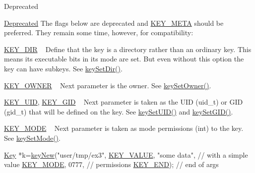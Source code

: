 \begin{DoxyRefDesc}{Deprecated}
\item[\hyperlink{deprecated__deprecated000010}{Deprecated}]The flags below are deprecated and \hyperlink{group__key_gga91fb3178848bd682000958089abbaf40a040582834bb2d90049947d7ef74e87e2}{K\+E\+Y\+\_\+\+M\+E\+TA} should be preferred. They remain some time, however, for compatibility\+:
\begin{DoxyItemize}
\item \hyperlink{group__key_gga91fb3178848bd682000958089abbaf40a9e43e47c8a21478538e2d20e049981d5}{K\+E\+Y\+\_\+\+D\+IR} ~\newline
 Define that the key is a directory rather than an ordinary key. This means its executable bits in its mode are set. But even without this option the key can have subkeys. See \hyperlink{group__meta_gaae575bd86a628a15ee45baa860522e75}{key\+Set\+Dir()}.
\item \hyperlink{group__key_gga91fb3178848bd682000958089abbaf40a77ca60362fa8daca8d5347db4385068b}{K\+E\+Y\+\_\+\+O\+W\+N\+ER} ~\newline
 Next parameter is the owner. See \hyperlink{owner_8c_a88d6ec200ba0707b7c1b4a88133d2be4}{key\+Set\+Owner()}.
\item \hyperlink{group__key_gga91fb3178848bd682000958089abbaf40a28f01a87d65f065172f734c9c9446c0e}{K\+E\+Y\+\_\+\+U\+ID}, \hyperlink{group__key_gga91fb3178848bd682000958089abbaf40ac0628bbaba7c837ca73323681393d15f}{K\+E\+Y\+\_\+\+G\+ID} ~\newline
 Next parameter is taken as the U\+ID (uid\+\_\+t) or G\+ID (gid\+\_\+t) that will be defined on the key. See \hyperlink{group__meta_gab5f284f5ecd261e0a290095f50ba1af7}{key\+Set\+U\+I\+D()} and \hyperlink{group__meta_ga9e3d0fb3f7ba906e067727b9155d22e3}{key\+Set\+G\+I\+D()}.
\item \hyperlink{group__key_gga91fb3178848bd682000958089abbaf40a1b0a91ff3a855d6993930ebf0abaa518}{K\+E\+Y\+\_\+\+M\+O\+DE} ~\newline
 Next parameter is taken as mode permissions (int) to the key. See \hyperlink{group__meta_ga8803037e35b9da1ce492323a88ff6bc3}{key\+Set\+Mode()}. 
\begin{DoxyCodeInclude}
\hyperlink{classkdb_1_1Key_a5679f5cae63caddd64a60388b9cc77fa}{Key} *k=\hyperlink{group__key_gad23c65b44bf48d773759e1f9a4d43b89}{keyNew}(\textcolor{stringliteral}{"user/tmp/ex3"},
        \hyperlink{group__key_gga91fb3178848bd682000958089abbaf40ac66e4a49d09212b79f5754ca6db5bd2e}{KEY\_VALUE}, \textcolor{stringliteral}{"some data"},    \textcolor{comment}{// with a simple value}
        \hyperlink{group__key_gga91fb3178848bd682000958089abbaf40a1b0a91ff3a855d6993930ebf0abaa518}{KEY\_MODE}, 0777,            \textcolor{comment}{// permissions}
        \hyperlink{group__key_gga91fb3178848bd682000958089abbaf40aa8adb6fcb92dec58fb19410eacfdd403}{KEY\_END});                  \textcolor{comment}{// end of args}
\end{DoxyCodeInclude}


\end{DoxyItemize}
\end{DoxyRefDesc}
